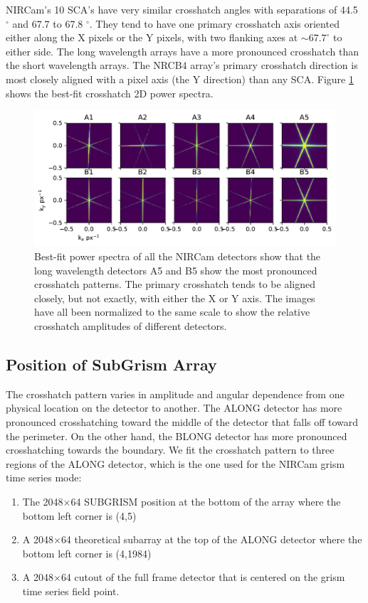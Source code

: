 \documentclass{aastex62}
\newcommand{\degree}{^\circ}
\begin{document}
NIRCam's 10 SCA's have very similar crosshatch angles with separations of 44.5 $\degree$ and 67.7 to 67.8 $\degree$.
They tend to have one primary crosshatch axis oriented either along the X pixels or the Y pixels, with two flanking axes at $\sim 67.7 \degree$ to either side.
The long wavelength arrays have a more pronounced crosshatch than the short wavelength arrays.
The NRCB4 array's primary crosshatch direction is most closely aligned with a pixel axis (the Y direction) than any SCA.
Figure \ref{fig:crosshatchModelGallery} shows the best-fit crosshatch 2D power spectra.

\begin{figure}[!hbtp]
\centering
\includegraphics[width=.99\columnwidth]{psd_models_gallery.pdf}
\caption{
Best-fit power spectra of all the NIRCam detectors show that the long wavelength detectors A5 and B5 show the most pronounced crosshatch patterns.
The primary crosshatch tends to be aligned closely, but not exactly, with either the X or Y axis.
The images have all been normalized to the same scale to show the relative crosshatch amplitudes of different detectors.
}\label{fig:crosshatchModelGallery}
\end{figure}

\clearpage
\subsection{Position of SubGrism Array}

The crosshatch pattern varies in amplitude and angular dependence from one physical location on the detector to another.
The ALONG detector has more pronounced crosshatching toward the middle of the detector that falls off toward the perimeter.
On the other hand, the BLONG detector has more pronounced crosshatching towards the boundary.
We fit the crosshatch pattern to three regions of the ALONG detector, which is the one used for the NIRCam grism time series mode:
\begin{enumerate}
	\item The 2048$\times$64 SUBGRISM position at the bottom of the array where the bottom left corner is (4,5) \label{subgrism64pos}
	\item A 2048$\times$64 theoretical subarray at the top of the ALONG detector where the bottom left corner is (4,1984)
	\item A 2048$\times$64 cutout of the full frame detector that is centered on the grism time series field point.
\end{enumerate}
\end{document}
